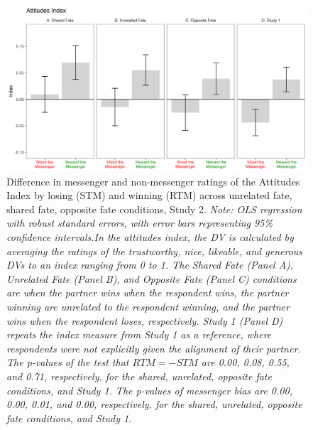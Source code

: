 \renewcommand{\baselinestretch}{1.25}%
\begin{figure}[!t]%
  \centering
  \includegraphics[width=1.0\textwidth]{figures/study2_main_attitude_all.png}
  \caption{Difference in messenger and non-messenger ratings of the Attitudes Index by losing (STM) and winning (RTM) across unrelated fate, shared fate, opposite fate conditions, Study 2. 
  \textit{Note: OLS regression with robust standard errors, with error bars representing 95\% confidence intervals.In the attitudes index, the DV is calculated by averaging the ratings of the trustworthy, nice, likeable, and generous DVs to an index ranging from 0 to 1. The Shared Fate (Panel A), Unrelated Fate (Panel B), and Opposite Fate (Panel C) conditions are when the partner wins when the respondent wins, the partner winning are unrelated to the respondent winning, and the partner wins when the respondent loses, respectively. Study 1 (Panel D) repeats the index measure from Study 1 as a reference, where respondents were not explicitly given the alignment of their partner. The p-values of the test that $RTM = -STM$ are 0.00, 0.08, 0.55, and 0.71, respectively, for the shared, unrelated, opposite fate conditions, and Study 1. The p-values of messenger bias are 0.00, 0.00, 0.01, and 0.00, respectively, for the shared, unrelated, opposite fate conditions, and Study 1.}}
  \label{fig:study2_main_attitude_all}
\end{figure}%
\renewcommand{\baselinestretch}{1.67}%
